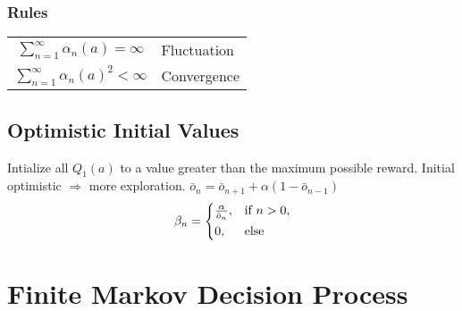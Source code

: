 \documentclass[10pt, landscape, a4paper]{article}
\begin{document}
\begin{multicols}{3}
        \subsubsection{Rules}
        \begin{tabular}{ c l }
            $\sum_{n=1}^\infty \alpha_n(a) = \infty$   & Fluctuation \\
            $\sum_{n=1}^\infty \alpha_n(a)^2 < \infty$ & Convergence \\
        \end{tabular}

        \subsection{Optimistic Initial Values}
        Intialize all $Q_1(a)$ to a value greater than the maximum possible reward.
        Initial optimistic $\Rightarrow$ more exploration.
        $\bar{o}_n=\bar{o}_{n+1}+\alpha(1-\bar{o}_{n-1})$
        \begin{equation}
            \beta_n = \begin{cases*}
                          \frac{\alpha}{\bar{o}_n}, & if $ n > 0 $,\\
                          0, & else
            \end{cases*}
        \end{equation}


        \section{Finite Markov Decision Process}


\end{multicols}
\end{document}
